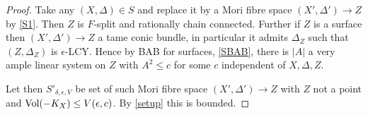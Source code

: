 %
\begin{proof}
	Take any $(X,\Delta)\in S$ and replace it by a Mori fibre space $(X',\Delta') \to Z$ by \autoref{S1}. Then $Z$ is $F$-split and rationally chain connected. Further if $Z$ is a surface then $(X',\Delta')\to Z$ a tame conic bundle, in particular it admits $\Delta_{Z}$ such that $(Z,\Delta_{Z})$ is $\epsilon$-LCY. Hence by BAB for surfaces, \autoref{SBAB}, there is $|A|$ a very ample linear system on $Z$ with $A^{2}\leq c$ for some $c$ independent of $X,\Delta,Z$. 
	
	Let then $S'_{\delta,\epsilon,V}$ be set of such Mori fibre space $(X',\Delta') \to Z$ with $Z$ not a point and $\text{Vol}(-K_{X})\leq V(\epsilon,c)$. By \autoref{setup} this is bounded.	
	\end{proof}

%
%
%	
	
%